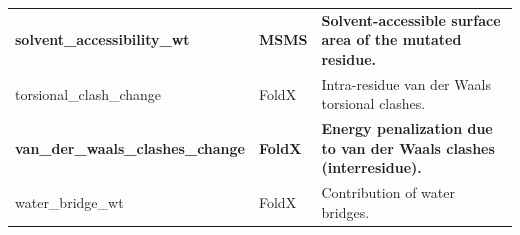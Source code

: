 \begin{table}[tb]
\begin{tabular}{ l | l | p{7cm} }
		\textbf{solvent\_accessibility\_wt}       & \textbf{MSMS}    & \textbf{Solvent-accessible surface area of the mutated residue.}                                    \\
		torsional\_clash\_change                  & FoldX            & Intra-residue van der Waals torsional clashes.                                                      \\
		\textbf{van\_der\_waals\_clashes\_change} & \textbf{FoldX}   & \textbf{Energy penalization due to van der Waals clashes (interresidue).}                           \\
		water\_bridge\_wt                         & FoldX            & Contribution of water bridges.                                                                      \\
		\bottomrule
	\end{tabular}
\end{table}

